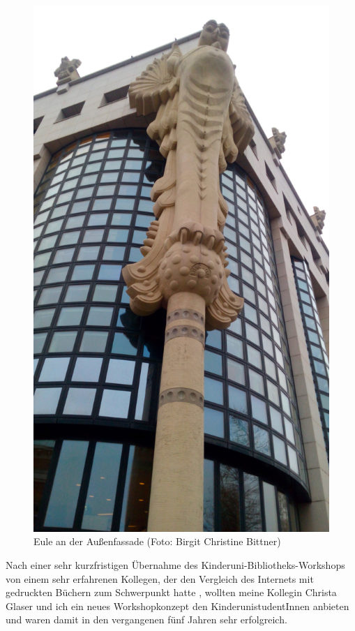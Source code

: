 \documentclass[a4paper,
fontsize=11pt,
oneside,
numbers=noperiodatend,
parskip=half-,
bibliography=totoc,
final
]{scrartcl}
\begin{document}
\begin{figure}
\centering
\includegraphics{img/image_1.jpg}
\caption{Eule an der Außenfassade (Foto: Birgit Christine Bittner)}
\end{figure}

Nach einer sehr kurzfristigen Übernahme des
Kinderuni-Bibliotheks-Workshops von einem sehr erfahrenen Kollegen, der
den Vergleich des Internets mit gedruckten Büchern zum Schwerpunkt hatte
, wollten meine Kollegin Christa Glaser und ich ein neues
Workshopkonzept den KinderunistudentInnen anbieten und waren damit in
den vergangenen fünf Jahren sehr erfolgreich.
\end{document}
